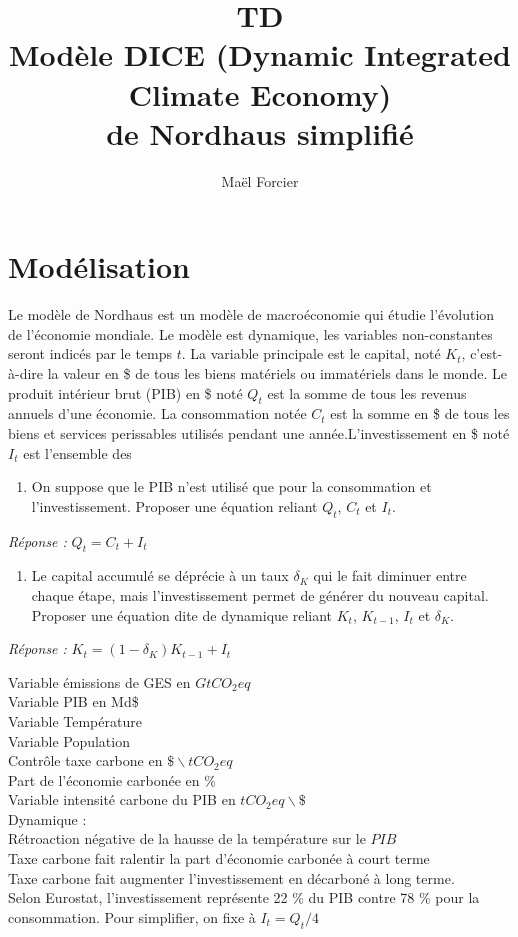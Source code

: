 \documentclass[12pt]{article}
\title{TD \\Modèle 
DICE (Dynamic Integrated Climate Economy) \\
de Nordhaus simplifié }
\author{Maël Forcier}
\newcommand{\tco}{tCO_2eq}
\theoremstyle{remark}
\begin{document}
\maketitle


\section{Modélisation}

Le modèle de Nordhaus est un modèle de macroéconomie qui étudie l'évolution de l'économie mondiale. Le modèle est dynamique, les variables non-constantes seront indicés par le temps $t$. La variable principale est le capital, noté $K_t$, c'est-à-dire la valeur en \$ de tous les biens matériels ou immatériels dans le monde. Le produit intérieur brut (PIB) en \$ noté $Q_t$ est la somme de tous les revenus annuels d'une économie. La consommation notée $C_t$ est la somme en \$ de tous les biens et services perissables utilisés pendant une année.L'investissement en \$ noté $I_t$ est l'ensemble des 

\begin{enumerate}
\item On suppose que le PIB n'est utilisé que pour la consommation et l'investissement. Proposer une équation reliant $Q_t$, $C_t$ et $I_t$.
\end{enumerate}
\textit{Réponse :} $Q_{t}=C_t + I_t$
\begin{enumerate}[resume]
\item  Le capital accumulé se déprécie à un taux $\delta_K$ qui le fait diminuer entre chaque étape, mais l'investissement permet de générer du nouveau capital. Proposer une équation dite de dynamique reliant $K_{t}$, $K_{t-1}$, $I_t$ et $\delta_K$.
\end{enumerate}
\textit{Réponse :} $K_{t}=(1-\delta_K)K_{t-1}+I_t$


Variable émissions de GES en $G\tco$\\
Variable PIB en Md\$\\
Variable Température \\
Variable Population \\
Contrôle taxe carbone en $\$ \backslash \tco$ \\
Part de l'économie carbonée en \% \\
Variable intensité carbone du PIB en $\tco \backslash \$ $
\\
Dynamique : \\
Rétroaction négative de la hausse de la température sur le $PIB$ \\
Taxe carbone fait ralentir la part d'économie carbonée à court terme\\
Taxe carbone fait augmenter l'investissement en décarboné à long terme.\\
Selon Eurostat, l'investissement représente 22 \% du PIB contre 78 \% pour la consommation. Pour simplifier, on fixe à $I_t=Q_t/4$
\end{document}
